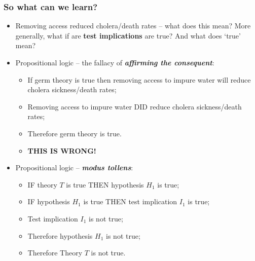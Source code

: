 \documentclass[aspectratio=169]{beamer}
\theoremstyle{principle}
\begin{document}
\begin{frame}
\frametitle{So what can we learn?}
\begin{itemize}
\item Removing access reduced cholera/death rates -- what does this mean?  More generally, what if are \textbf{test implications} are true?  And what does `true' mean?
\bigskip
\item Propositional logic -- the fallacy of \textit{\textbf{affirming the consequent}}:
\begin{itemize}
\item If germ theory is true then removing access to impure water will reduce cholera sickness/death rates;
\item Removing access to impure water DID reduce cholera sickness/death rates;
\item Therefore germ theory is true.
\item \textbf{THIS IS WRONG!}
\end{itemize}
\bigskip
\item Propositional logic -- \textit{\textbf{modus tollens}}:
\begin{itemize}
\item IF theory $T$ is true THEN hypothesis $H_1$ is true;
\item IF hypothesis $H_1$ is true THEN test implication $I_1$ is true;
\item Test implication $I_1$ is not true;
\item Therefore hypothesis $H_1$ is not true;
\item Therefore Theory $T$ is not true.
 \end{itemize}
\end{itemize}

\end{frame}
\end{document}
